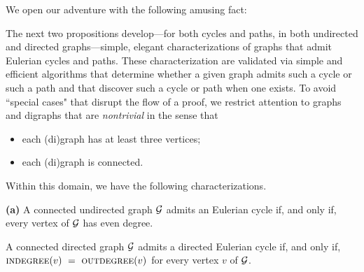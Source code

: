 \smallskip

We open our adventure with the following amusing fact:

\bigskip


\noindent {}

\bigskip

The next two propositions develop---for both cycles and paths, in both undirected and directed graphs---simple, elegant characterizations of graphs that admit Eulerian cycles and paths.
These characterization are validated via simple and efficient algorithms that determine whether a given graph admits such a cycle or such a path and that discover such a cycle or path when one exists.  To avoid ``special cases" that disrupt the flow of a proof, we restrict attention to graphs and digraphs that are {\em nontrivial} in the sense that
\begin{itemize}
\item
each (di)graph has at least three vertices;
\item
each (di)graph is connected.
\end{itemize}
Within this domain, we have the following characterizations.

\begin{prop}
\label{thm:eulerian-cycle}
{\bf (a)}
A connected undirected graph $\mbox{$\cal G$}$ admits an Eulerian cycle if, and only if, every vertex of $\mbox{$\cal G$}$ has even degree.

\smallskip

A connected directed graph $\mbox{$\cal G$}$ admits a directed Eulerian cycle if, and only if, $\mbox{\sc indegree}(v) \ = \ \mbox{\sc outdegree}(v)$ for every vertex $v$ of $\mbox{$\cal G$}$.
\end{prop}


